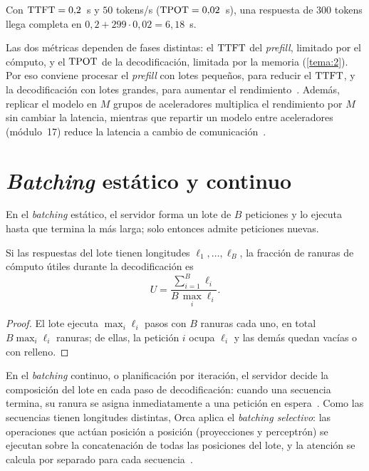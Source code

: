 \begin{ejemplo}\label{ej:latencia}
Con $\mathrm{TTFT}=0{,}2$~s y $50$ tokens/s ($\mathrm{TPOT}=0{,}02$~s), una respuesta de $300$ tokens llega completa en $0{,}2+299\cdot 0{,}02=6{,}18$~s.
\end{ejemplo}

Las dos métricas dependen de fases distintas: el $\mathrm{TTFT}$ del \emph{prefill}, limitado por el cómputo, y el $\mathrm{TPOT}$ de la decodificación, limitada por la memoria (\cref{tema:2}). Por eso conviene procesar el \emph{prefill} con lotes pequeños, para reducir el $\mathrm{TTFT}$, y la decodificación con lotes grandes, para aumentar el rendimiento~\cite{cs336}. Además, replicar el modelo en $M$ grupos de aceleradores multiplica el rendimiento por $M$ sin cambiar la latencia, mientras que repartir un modelo entre aceleradores (módulo~17) reduce la latencia a cambio de comunicación~\cite{cs336,pope}.

\section{\emph{Batching} estático y continuo}

\begin{definicion}\label{def:estatico}
En el \emph{batching} estático, el servidor forma un lote de $B$ peticiones y lo ejecuta hasta que termina la más larga; solo entonces admite peticiones nuevas.
\end{definicion}

\begin{proposicion}\label{prop:utilizacion}
Si las respuestas del lote tienen longitudes $\ell_1,\dots,\ell_B$, la fracción de ranuras de cómputo útiles durante la decodificación es
\[
U=\frac{\sum_{i=1}^{B}\ell_i}{B\,\max_i\ell_i}.
\]
\end{proposicion}

\begin{proof}
El lote ejecuta $\max_i\ell_i$ pasos con $B$ ranuras cada uno, en total $B\max_i\ell_i$ ranuras; de ellas, la petición $i$ ocupa $\ell_i$ y las demás quedan vacías o con relleno.
\end{proof}

\begin{definicion}\label{def:continuo}
En el \emph{batching} continuo, o planificación por iteración, el servidor decide la composición del lote en cada paso de decodificación: cuando una secuencia termina, su ranura se asigna inmediatamente a una petición en espera~\cite{orca}. Como las secuencias tienen longitudes distintas, Orca aplica el \emph{batching selectivo}: las operaciones que actúan posición a posición (proyecciones y perceptrón) se ejecutan sobre la concatenación de todas las posiciones del lote, y la atención se calcula por separado para cada secuencia~\cite{orca,cs336}.
\end{definicion}

